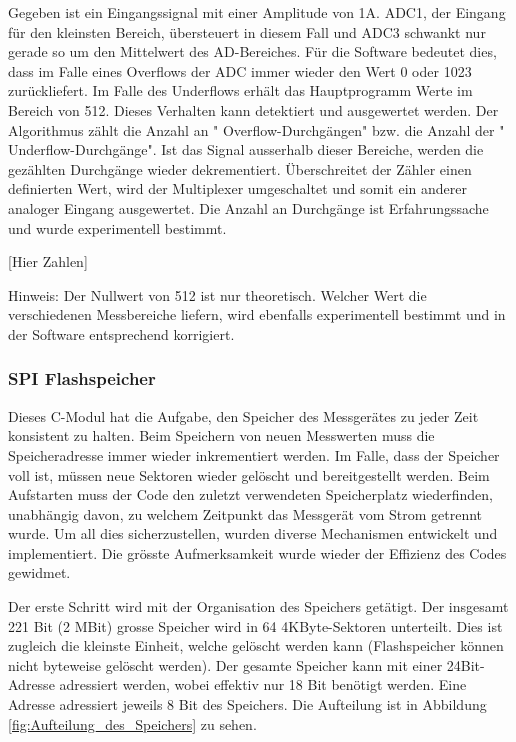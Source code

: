Gegeben ist ein Eingangssignal mit einer Amplitude von 1A. ADC1, der Eingang für den kleinsten Bereich, übersteuert in diesem Fall und ADC3 schwankt nur gerade so um den Mittelwert des AD-Bereiches. Für die Software bedeutet dies, dass im Falle eines Overflows der ADC immer wieder den Wert 0 oder 1023 zurückliefert. Im Falle des Underflows erhält das Hauptprogramm Werte im Bereich von 512. Dieses Verhalten kann detektiert und ausgewertet werden. Der Algorithmus zählt die Anzahl an " Overflow-Durchgängen"  bzw. die Anzahl der " Underflow-Durchgänge". Ist das Signal ausserhalb dieser Bereiche, werden die gezählten Durchgänge wieder dekrementiert. Überschreitet der Zähler einen definierten Wert, wird der Multiplexer umgeschaltet und somit ein anderer analoger Eingang ausgewertet. Die Anzahl an Durchgänge ist Erfahrungssache und wurde experimentell bestimmt. 

[Hier Zahlen]

Hinweis: Der Nullwert von 512 ist nur theoretisch. Welcher Wert die verschiedenen Messbereiche liefern, wird ebenfalls experimentell bestimmt und in der Software entsprechend korrigiert.

\subsubsection*{SPI Flashspeicher}

Dieses C-Modul hat die Aufgabe, den Speicher des Messgerätes zu jeder Zeit konsistent zu halten. Beim Speichern von neuen Messwerten muss die Speicheradresse immer wieder inkrementiert werden. Im Falle, dass der Speicher voll ist, müssen neue Sektoren wieder gelöscht und bereitgestellt werden. Beim Aufstarten muss der Code den zuletzt verwendeten Speicherplatz wiederfinden, unabhängig davon, zu welchem Zeitpunkt das Messgerät vom Strom getrennt wurde. Um all dies sicherzustellen, wurden diverse Mechanismen entwickelt und implementiert. Die grösste Aufmerksamkeit wurde wieder der Effizienz des Codes gewidmet. 

Der erste Schritt wird mit der Organisation des Speichers getätigt. Der insgesamt 221 Bit (2 MBit) grosse Speicher wird in 64 4KByte-Sektoren unterteilt. Dies ist zugleich die kleinste Einheit, welche gelöscht werden kann (Flashspeicher können nicht byteweise gelöscht werden). Der gesamte Speicher kann mit einer 24Bit-Adresse adressiert werden, wobei effektiv nur 18 Bit benötigt werden. Eine Adresse adressiert jeweils 8 Bit des Speichers. Die Aufteilung ist in Abbildung \ref{fig:Aufteilung_des_Speichers} zu sehen. 

